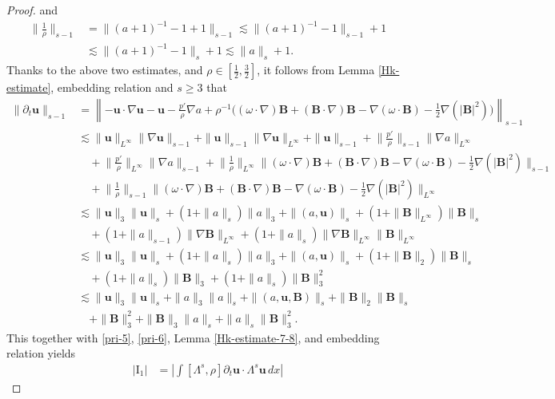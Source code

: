 \documentclass[12pt, reqno]{amsart}
\numberwithin{equation}{section}
\numberwithin{equation}{section}
\numberwithin{equation}{section}
\numberwithin{equation}{section}
\theoremstyle{remark}
\def\u{ \mathbf{u} }
\def\b{ \mathbf{B} }
\begin{document}
\begin{proof}
and
\begin{equation*}\begin{split}
\Big\|\frac{1}{\rho}\Big\|_{s-1}&=\|(a+1)^{-1}-1+1\|_{s-1}\lesssim\|(a+1)^{-1}-1\|_{s-1}+1\\
&\lesssim\|(a+1)^{-1}-1\|_{s}+1\lesssim\|a\|_{s}+1.
\end{split}\end{equation*}
Thanks to the above two estimates, and $\rho\in[\frac12,\frac32]$, it follows from Lemma \ref{Hk-estimate}, embedding relation and $s\geq3$ that
\begin{equation}\begin{split}\label{pri-6}
\|\partial_t\u\|_{s-1}&=\left\|-\u\cdot\nabla \u-\u-\frac{p'}{\rho}\nabla a+\rho^{-1}\big((\omega\cdot \nabla) \b+(\b\cdot \nabla) \b-\nabla(\omega\cdot \b)-\frac12\nabla(|\b|^2)\big)\right\|_{s-1}\\
&\lesssim\|\u\|_{L^\infty}\|\nabla\u\|_{s-1}+\|\u\|_{s-1}\|\nabla\u\|_{L^\infty}+\|\u\|_{s-1}+\Big\|\frac{p'}{\rho}\Big\|_{s-1}\|\nabla a\|_{L^\infty}\\
&\quad+\Big\|\frac{p'}{\rho}\Big\|_{L^\infty}\|\nabla a\|_{s-1}+\Big\|\frac1\rho\Big\|_{L^\infty}
\|(\omega\cdot \nabla) \b+(\b\cdot \nabla) \b-\nabla(\omega\cdot \b)-\frac12\nabla(|\b|^2)\|_{s-1}\\
&\quad+\Big\|\frac1\rho\Big\|_{s-1}
\|(\omega\cdot \nabla) \b+(\b\cdot \nabla) \b-\nabla(\omega\cdot \b)-\frac12\nabla(|\b|^2)\|_{L^\infty}\\
&\lesssim\|\u\|_3\|\u\|_s+(1+\|a\|_s)\|a\|_3+\|(a,\u)\|_s+(1+\|\b\|_{L^\infty})\|\b\|_{s}\\
&\quad+(1+\|a\|_{s-1})\|\nabla \b\|_{L^\infty}
+(1+\|a\|_s)\|\nabla \b\|_{L^\infty}\|\b\|_{L^\infty}\\
&\lesssim\|\u\|_3\|\u\|_s+(1+\|a\|_s)\|a\|_3+\|(a,\u)\|_s+(1+\|\b\|_2)\|\b\|_{s}\\
&\quad+(1+\|a\|_{s})\|\b\|_3
+(1+\|a\|_s)\|\b\|_3^{2}
\\ &\lesssim\|\u\|_3\|\u\|_s+\|a\|_3\|a\|_s+\|(a,\u,\b)\|_s+\|\b\|_2\|\b\|_{s}\\
&\quad+\|\b\|^{2}_3+\|\b\|_3\|a\|_s+\|a\|_s\|\b\|^{2}_3.
\end{split}\end{equation}
This together with \eqref{pri-5}, \eqref{pri-6}, Lemma \ref{Hk-estimate-7-8}, and embedding relation yields
\begin{equation*}\begin{split}
|\textrm{I}_{1}|&=\left|\int[\Lambda^s,\rho]\partial_t\u\cdot\Lambda^s \u \,dx\right|

\end{split}
\end{equation*}
\end{proof}
\end{document}

